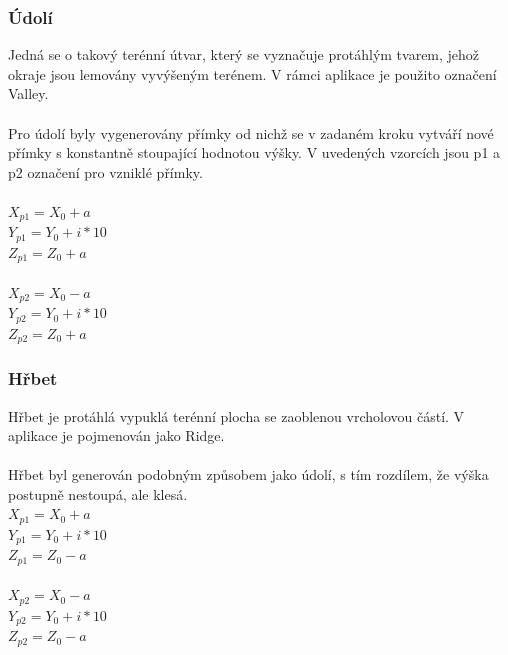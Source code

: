 \documentclass[a4paper, 12pt]{article}
\begin{document}
\subsubsection{Údolí}
Jedná se o takový terénní útvar, který se vyznačuje protáhlým tvarem, jehož okraje jsou lemovány vyvýšeným terénem. V rámci aplikace je použito označení Valley. \\
\\
Pro údolí byly vygenerovány přímky od nichž se v zadaném kroku vytváří nové přímky s konstantně stoupající hodnotou výšky. V uvedených vzorcích jsou p1 a p2 označení pro vzniklé přímky.\\
\\
$ X_{p1} = X_0 + a $ \\
$ Y_{p1} = Y_0 + i * 10 $ \\
$ Z_{p1} = Z_0 + a $ \\
\\
$ X_{p2} = X_0 - a $ \\
$ Y_{p2} = Y_0 + i * 10 $ \\
$ Z_{p2} = Z_0 + a $ \\

\subsubsection{Hřbet}
Hřbet je protáhlá vypuklá terénní plocha se zaoblenou vrcholovou částí. V aplikace je pojmenován jako Ridge. \\
\\
Hřbet byl generován podobným způsobem jako údolí, s tím rozdílem, že výška postupně nestoupá, ale klesá. \\
$ X_{p1} = X_0 + a $ \\
$ Y_{p1} = Y_0 + i * 10 $ \\
$ Z_{p1} = Z_0 - a $ \\
\\
$ X_{p2} = X_0 - a $ \\
$ Y_{p2} = Y_0 + i * 10 $ \\
$ Z_{p2} = Z_0 - a $ \\
\end{document}
